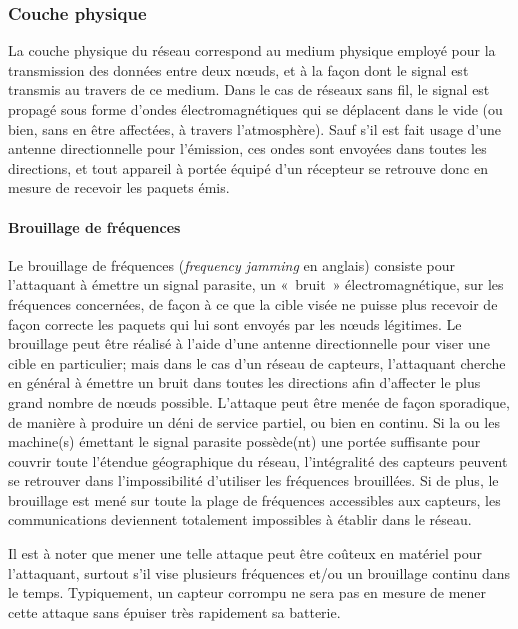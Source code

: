     \subsubsection{Couche physique}
La couche physique du réseau correspond au medium physique employé pour la transmission des données entre deux nœuds, et à la façon dont le signal est transmis au travers de ce medium.
Dans le cas de réseaux sans fil, le signal est propagé sous forme d'ondes électromagnétiques qui se déplacent dans le vide (ou bien, sans en être affectées, à travers l'atmosphère).
Sauf s'il est fait usage d'une antenne directionnelle pour l'émission, ces ondes sont envoyées dans toutes les directions, et tout appareil à portée équipé d'un récepteur se retrouve donc en mesure de recevoir les paquets émis.

        \paragraph{Brouillage de fréquences}
Le brouillage de fréquences (\textit{frequency jamming} en anglais) consiste pour l'attaquant à émettre un signal parasite, un « bruit » électromagnétique, sur les fréquences concernées, de façon à ce que la cible visée ne puisse plus recevoir de façon correcte les paquets qui lui sont envoyés par les nœuds légitimes.
Le brouillage peut être réalisé à l'aide d'une antenne directionnelle pour viser une cible en particulier; mais dans le cas d'un réseau de capteurs, l'attaquant cherche en général à émettre un bruit dans toutes les directions afin d'affecter le plus grand nombre de nœuds possible.
L'attaque peut être menée de façon sporadique, de manière à produire un déni de service partiel, ou bien en continu.
Si la ou les machine(s) émettant le signal parasite possède(nt) une portée suffisante pour couvrir toute l'étendue géographique du réseau, l'intégralité des capteurs peuvent se retrouver dans l'impossibilité d'utiliser les fréquences brouillées.
Si de plus, le brouillage est mené sur toute la plage de fréquences accessibles aux capteurs, les communications deviennent totalement impossibles à établir dans le réseau.

Il est à noter que mener une telle attaque peut être coûteux en matériel pour l'attaquant, surtout s'il vise plusieurs fréquences et/ou un brouillage continu dans le temps.
Typiquement, un capteur corrompu ne sera pas en mesure de mener cette attaque sans épuiser très rapidement sa batterie.

